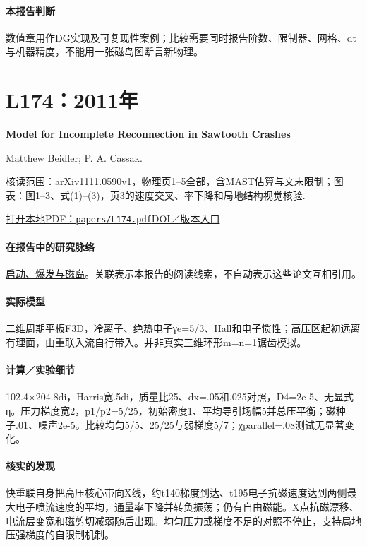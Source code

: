 \paragraph{本报告判断}数值章用作DG实现及可复现性案例；比较需要同时报告阶数、限制器、网格、dt与机器精度，不能用一张磁岛图断言新物理。

\section{L174：2011年}\label{paper:L174}

\textbf{Model for Incomplete Reconnection in Sawtooth Crashes}\citep{L174}\

Matthew Beidler;  P. A. Cassak.

\textsf{核读范围：}arXiv1111.0590v1，物理页1–5全部，含MAST估算与文末限制；\textsf{图表：}图1–3、式(1)–(3)，页3的速度交叉、率下降和局地结构视觉核验.

\href{run:papers/L174.pdf}{打开本地PDF：\texttt{papers/L174.pdf}}\quad\href{https://doi.org/10.1103/physrevlett.107.255002}{DOI／版本入口}

\paragraph{在报告中的研究脉络}\hyperref[story:onset]{启动、爆发与磁岛}。关联表示本报告的阅读线索，不自动表示这些论文互相引用。

\paragraph{实际模型}二维周期平板F3D，冷离子、绝热电子γe=5/3、Hall和电子惯性；高压区起初远离有理面，由重联入流自行带入。并非真实三维环形m=n=1锯齿模拟。

\paragraph{计算／实验细节}102.4×204.8di，Harris宽.5di，质量比25、dx=.05和.025对照，D4=2e-5、无显式η。压力梯度宽2，p1/p2=5/25，初始密度1、平均导引场幅5并总压平衡；磁种子.01、噪声2e-5。比较均匀5/5、25/25与弱梯度5/7；χparallel=.08测试无显著变化。

\paragraph{核实的发现}快重联自身把高压核心带向X线，约t140梯度到达、t195电子抗磁速度达到两侧最大电子喷流速度的平均，通量率下降并转负振荡；仍有自由磁能。X点抗磁漂移、电流层变宽和磁剪切减弱随后出现。均匀压力或梯度不足的对照不停止，支持局地压强梯度的自限制机制。

